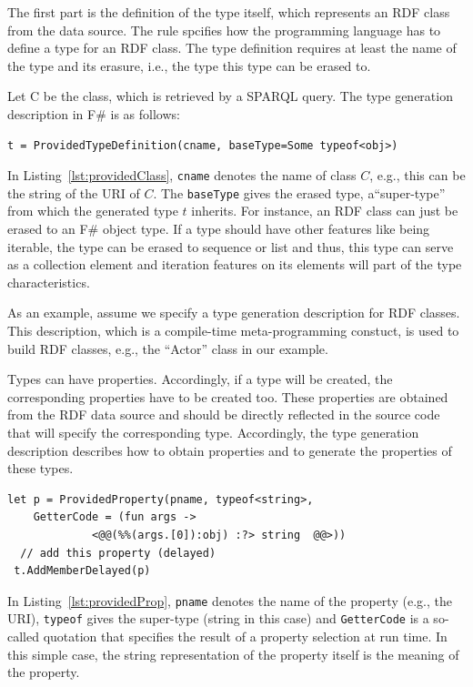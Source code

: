 \documentclass{llncs} %
\newcommand{\fs}{\textsf{F\#}\xspace}
\begin{document}
The first part is the definition of the type itself, which represents an RDF class from the data source.
The rule spcifies how the programming language has to define a type for an RDF class.
The type definition requires at least the name of the type and its erasure, i.e., the type this type can be erased to.

Let C be the class, which is retrieved by a SPARQL query. The type generation description in \fs
is as follows:

\begin{lstlisting}[style=code, caption={\textbf{Type Rule:} Type Generation Description for RDF Class C}, label={lst:providedClass}]
t = ProvidedTypeDefinition(cname, baseType=Some typeof<obj>)
\end{lstlisting}

In Listing~\ref{lst:providedClass}, \texttt{cname} denotes the name of class $C$, e.g., this can be the string of the URI of $C$.
The \texttt{baseType} gives the erased type, a``super-type'' from which the generated type $t$ inherits.
For instance, an RDF class can just be erased to an \fs object type. If a type should have other features
like being iterable, the type can be erased to sequence or list and thus, this type can serve as a collection
element and iteration features on its elements will part of the type characteristics.

As an example, assume we specify a type generation description for RDF classes.
This description, which is a compile-time meta-programming constuct, is
used to build RDF classes, e.g., the ``Actor'' class in our example.


Types can have properties. Accordingly, if a type will be created, the corresponding properties
have to be created too. These properties are obtained from the RDF data source and should
be directly reflected in the source code that will specify the corresponding type.
Accordingly, the type generation description describes how to obtain properties and to
generate the properties of these types.

\begin{lstlisting}[style=code, caption={\texttt{Property Rule:} Add Property for Class C}, label={lst:providedProp}]
 let p = ProvidedProperty(pname, typeof<string>, 
    GetterCode = (fun args -> 
		     <@@(%%(args.[0]):obj) :?> string  @@>))
  // add this property (delayed)
 t.AddMemberDelayed(p)
 \end{lstlisting}

In Listing~\ref{lst:providedProp}, \texttt{pname} denotes the name of the property (e.g., the URI), \texttt{typeof} gives the
super-type (string in this case) and \texttt{GetterCode} is a so-called quotation that specifies the result of a property selection at run time.
In this simple case, the string representation of the property itself is the meaning of the property.
\end{document}
